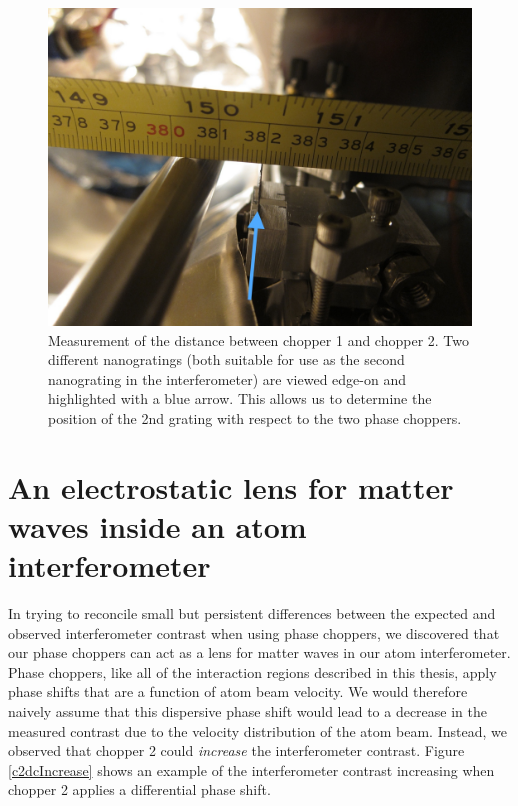 \begin{figure}
\includegraphics[width=1\textwidth]{Figures/distMeas_2g_arrow.jpg}
\caption[Photograph for the measurement of the distance between chopper 1 and chopper 2 showing the 2nd nanograting.]{\label{distMeas_2g}Measurement of the distance between chopper 1 and chopper 2. Two different nanogratings (both suitable for use as the second nanograting in the interferometer) are viewed edge-on and highlighted with a blue arrow. This allows us to determine the position of the 2nd grating with respect to the two phase choppers.}
\end{figure}





\section{An electrostatic lens for matter waves inside an atom interferometer}
\label{lensSection}
In trying to reconcile small but persistent differences between the expected and observed interferometer contrast when using phase choppers, we discovered that our phase choppers can act as a lens for matter waves in our atom interferometer. Phase choppers, like all of the interaction regions described in this thesis, apply phase shifts that are a function of atom beam velocity. We would therefore naively assume that this dispersive phase shift would lead to a decrease in the measured contrast due to the velocity distribution of the atom beam. Instead, we observed that chopper 2 could \emph{increase} the interferometer contrast. Figure \ref{c2dcIncrease} shows an example of the interferometer contrast increasing when chopper 2 applies a differential phase shift. 


